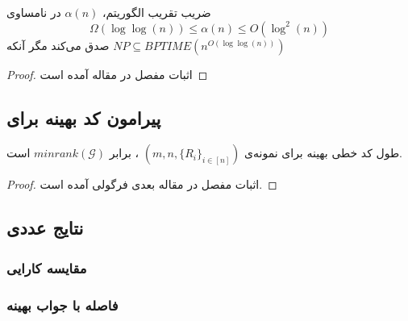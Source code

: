 \begin{theorem}
	\label{theorem:pliable2016:theorem2}
	ضریب تقریب الگوریتم،
	$\alpha(n)$
	در نامساوی
	$$\Omega(\log \log (n)) \leq \alpha(n) \leq O(\log^2(n))$$
	صدق می‌کند مگر آنکه
	$NP \subseteq BPTIME(n^{O(\log \log (n))})$
\end{theorem}
\begin{proof}
	اثبات مفصل در مقاله آمده است
\end{proof}

\subsection{
پیرامون کد بهینه برای
\picod
}

\begin{theorem}
	\label{theorem:pliable2016:theorem3}
	طول کد خطی بهینه برای نمونه‌ی
	$(m, n, \{R_i\}_{i \in [n]})$
	،
	\picod
	برابر
	$minrank(\mathcal{G})$
	است.
\end{theorem}
\begin{proof}
	اثبات مفصل در مقاله  بعدی فرگولی 
	\cite{song2016deterministic}
	آمده است.
\end{proof}

\subsection{
نتایج عددی
}
\subsubsection{
مقایسه کارایی
}
\subsubsection{
	فاصله با جواب بهینه
}









